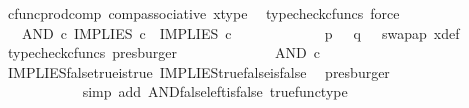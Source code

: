 \begin{isabellebody}
\ cfunc{\isacharunderscore}{\kern0pt}prod{\isacharunderscore}{\kern0pt}comp\ comp{\isacharunderscore}{\kern0pt}associative{}\ x{\isacharunderscore}{\kern0pt}type\ \isamarkupfalse%
\ {\isacharparenleft}{\kern0pt}typecheck{\isacharunderscore}{\kern0pt}cfuncs{\isacharcomma}{\kern0pt}\ force{\isacharparenright}{\kern0pt}\isanewline
\ \ \ \ \ \ \ \ \isamarkupfalse%
\ \isamarkupfalse%
\ {\isachardoublequoteopen}{\isachardot}{\kern0pt}{\isachardot}{\kern0pt}{\isachardot}{\kern0pt}\ {\isacharequal}{\kern0pt}\ AND\ {\isasymcirc}\isactrlsub c\ {\isasymlangle}IMPLIES\ {\isasymcirc}\isactrlsub c\ {\isasymlangle}{\isasymt}{\isacharcomma}{\kern0pt}{\isasymf}{\isasymrangle}{\isacharcomma}{\kern0pt}\ IMPLIES\ {\isasymcirc}\isactrlsub c\ {\isasymlangle}{\isasymf}{\isacharcomma}{\kern0pt}{\isasymt}{\isasymrangle}{\isasymrangle}{\isachardoublequoteclose}\isanewline
\ \ \ \ \ \ \ \ \ \ \isamarkupfalse%
\ {\isacartoucheopen}p\ {\isacharequal}{\kern0pt}\ {\isasymt}{\isacartoucheclose}\ {\isacartoucheopen}q\ {\isacharequal}{\kern0pt}\ {\isasymf}{\isacartoucheclose}\ swap{\isacharunderscore}{\kern0pt}ap\ x{\isacharunderscore}{\kern0pt}def\ \isamarkupfalse%
\ {\isacharparenleft}{\kern0pt}typecheck{\isacharunderscore}{\kern0pt}cfuncs{\isacharcomma}{\kern0pt}\ presburger{\isacharparenright}{\kern0pt}\isanewline
\ \ \ \ \ \ \ \ \isamarkupfalse%
\ \isamarkupfalse%
\ {\isachardoublequoteopen}{\isachardot}{\kern0pt}{\isachardot}{\kern0pt}{\isachardot}{\kern0pt}\ {\isacharequal}{\kern0pt}\ AND\ {\isasymcirc}\isactrlsub c\ {\isasymlangle}{\isasymf}{\isacharcomma}{\kern0pt}\ {\isasymt}{\isasymrangle}{\isachardoublequoteclose}\isanewline
\ \ \ \ \ \ \ \ \ \ \isamarkupfalse%
\ IMPLIES{\isacharunderscore}{\kern0pt}false{\isacharunderscore}{\kern0pt}true{\isacharunderscore}{\kern0pt}is{\isacharunderscore}{\kern0pt}true\ IMPLIES{\isacharunderscore}{\kern0pt}true{\isacharunderscore}{\kern0pt}false{\isacharunderscore}{\kern0pt}is{\isacharunderscore}{\kern0pt}false\ \isamarkupfalse%
\ presburger\isanewline
\ \ \ \ \ \ \ \ \isamarkupfalse%
\ \isamarkupfalse%
\ {\isachardoublequoteopen}{\isachardot}{\kern0pt}{\isachardot}{\kern0pt}{\isachardot}{\kern0pt}\ {\isacharequal}{\kern0pt}\ {\isasymf}{\isachardoublequoteclose}\isanewline
\ \ \ \ \ \ \ \ \ \ \isamarkupfalse%
\ {\isacharparenleft}{\kern0pt}simp\ add{\isacharcolon}{\kern0pt}\ AND{\isacharunderscore}{\kern0pt}false{\isacharunderscore}{\kern0pt}left{\isacharunderscore}{\kern0pt}is{\isacharunderscore}{\kern0pt}false\ true{\isacharunderscore}{\kern0pt}func{\isacharunderscore}{\kern0pt}type{\isacharparenright}{\kern0pt}\isanewline

\end{isabellebody}

